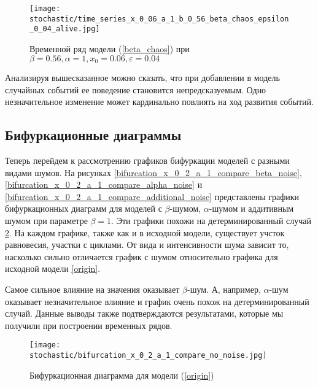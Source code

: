         \begin{figure}
            \centering
            \texttt{[image: stochastic/time\_series\_x\_0\_06\_a\_1\_b\_0\_56\_beta\_chaos\_epsilon\_0\_04\_alive.jpg]}
        
            \captionsetup{justification=centering}
            \caption{Временной ряд модели (\ref{beta_chaos}) при \(\beta = 0.56, \alpha = 1, x_0 = 0.06, \varepsilon = 0.04\)}
            \label{time_series_x_0_06_a_1_b_0_56_beta_chaos_epsilon_0_04_alive}
        \end{figure}

        Анализируя вышесказанное можно сказать, что при добавлении в модель случайных событий ее поведение становится непредсказуемым. Одно незначительное изменение может кардинально повлиять на ход развития событий. 


    \subsection{Бифуркационные диаграммы}

        Теперь перейдем к рассмотрению графиков бифуркации моделей с разными видами шумов. На рисунках \ref{bifurcation_x_0_2_a_1_compare_beta_noise}, \ref{bifurcation_x_0_2_a_1_compare_alpha_noise} и \ref{bifurcation_x_0_2_a_1_compare_additional_noise} представлены графики бифуркационных диаграмм для моделей с \(\beta\)-шумом, \(\alpha\)-шумом и аддитивным шумом при параметре \(\beta = 1\). Эти графики похожи на детерминированный случай \ref{bifurcation_x_0_2_a_1_compare_no_noise}. На каждом графике, также как и в исходной модели, существует учсток равновесия, участки с циклами. От вида и интенсивности шума зависит то, насколько сильно отличается график с шумом относительно графика для исходной модели \ref{origin}. 

        Самое сильное влияние на значения оказывает \(\beta\)-шум. А, например, \(\alpha\)-шум оказывает незначительное влияние и график очень похож на детерминированный случай. Данные выводы также подтверждаются результатами, которые мы получили при построении временных рядов.


        \begin{figure}
            \centering
            \texttt{[image: stochastic/bifurcation\_x\_0\_2\_a\_1\_compare\_no\_noise.jpg]}
        
            \captionsetup{justification=centering}
            \caption{Бифуркационная диаграмма для модели (\ref{origin})}
            \label{bifurcation_x_0_2_a_1_compare_no_noise}
        \end{figure}

